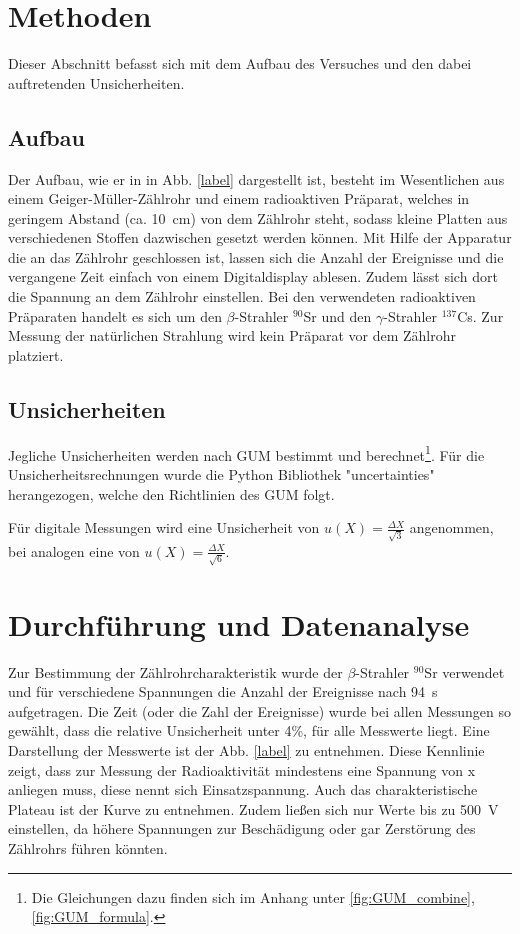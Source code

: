 \section{Methoden}
	
	Dieser Abschnitt befasst sich mit dem Aufbau des Versuches und den dabei auftretenden Unsicherheiten.
	
	\subsection{Aufbau}	
		
		Der Aufbau, wie er in in Abb. \ref{label} dargestellt ist, besteht im Wesentlichen aus einem Geiger-Müller-Zählrohr und einem radioaktiven Präparat, welches in geringem Abstand (ca. \SI{10}{\centi\meter}) von dem Zählrohr steht, sodass kleine Platten aus verschiedenen Stoffen dazwischen gesetzt werden können.
		Mit Hilfe der Apparatur die an das Zählrohr geschlossen ist, lassen sich die Anzahl der Ereignisse und die vergangene Zeit einfach von einem Digitaldisplay ablesen.
		Zudem lässt sich dort die Spannung an dem Zählrohr einstellen.
		Bei den verwendeten radioaktiven Präparaten handelt es sich um den $\beta$-Strahler $^{90}$Sr und den $\gamma$-Strahler $^{137}$Cs.
		Zur Messung der natürlichen Strahlung wird kein Präparat vor dem Zählrohr platziert.
				
	\subsection{Unsicherheiten}
	
		Jegliche Unsicherheiten werden nach GUM bestimmt und berechnet\footnote{Die Gleichungen dazu finden sich im Anhang unter \ref{fig:GUM_combine}, \ref{fig:GUM_formula}.}.
		Für die Unsicherheitsrechnungen wurde die Python Bibliothek "uncertainties" herangezogen, welche den Richtlinien des GUM folgt.
	
		Für digitale Messungen wird eine Unsicherheit von $u(X) = \frac{\Delta X}{\sqrt{3}}$ angenommen, bei analogen eine von $u(X) = \frac{\Delta X}{\sqrt{6}}$.

\section{Durchführung und Datenanalyse}
		
	Zur Bestimmung der Zählrohrcharakteristik wurde der $\beta$-Strahler $^{90}$Sr verwendet und für verschiedene Spannungen die Anzahl der Ereignisse nach \SI{94}{\second} aufgetragen.
	Die Zeit (oder die Zahl der Ereignisse) wurde bei allen Messungen so gewählt, dass die relative Unsicherheit unter 4\%, für alle Messwerte liegt.
	Eine Darstellung der Messwerte ist der Abb. \ref{label} zu entnehmen.
	Diese Kennlinie zeigt, dass zur Messung der Radioaktivität mindestens eine Spannung von x anliegen muss, diese nennt sich Einsatzspannung.
	Auch das charakteristische Plateau ist der Kurve zu entnehmen.
	Zudem ließen sich nur Werte bis zu \SI{500}{\volt} einstellen, da höhere Spannungen zur Beschädigung oder gar Zerstörung des Zählrohrs führen könnten.
	
